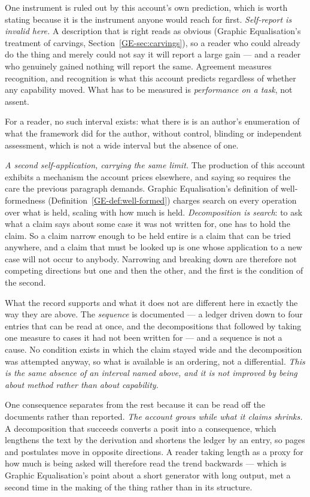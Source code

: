 \documentclass[11pt,a4paper]{article}
\begin{document}
One instrument is ruled out by this account's own prediction, which is worth stating because it is the
instrument anyone would reach for first. \emph{Self-report is invalid here.} A description that is
right reads as obvious (Graphic Equalisation's treatment of carvings, Section~\ref{GE-sec:carvings}), so a reader who could already do the thing and
merely could not say it will report a large gain --- and a reader who genuinely gained nothing will
report the same. Agreement measures recognition, and recognition is what this account predicts
regardless of whether any capability moved. What has to be measured is \emph{performance on a task},
not assent.

For a reader, no such interval exists: what there is is an author's enumeration of what the framework
did for the author, without control, blinding or independent assessment, which
is not a wide interval but the absence of one.

\emph{A second self-application, carrying the same limit.} The production of this account exhibits a
mechanism the account prices elsewhere, and saying so requires the care the previous paragraph
demands. Graphic Equalisation's definition of well-formedness (Definition~\ref{GE-def:well-formed})
charges search on every operation over
what is held, scaling with how much is held. \emph{Decomposition is search}: to ask what a claim says
about some case it was not written for, one has to hold the claim. So a claim narrow enough to be held
entire is a claim that can be tried anywhere, and a claim that must be looked up is one whose
application to a new case will not occur to anybody. Narrowing and breaking down are therefore not
competing directions but one and then the other, and the first is the condition of the second.

What the record supports and what it does not are different here in exactly the way they are above.
The \emph{sequence} is documented --- a ledger driven down to four entries that can be read at once,
and the decompositions that followed by taking one measure to cases it had not been written for --- and
a sequence is not a cause. No condition exists in which the claim stayed wide and the decomposition was
attempted anyway, so what is available is an ordering, not a differential. \emph{This is the same
absence of an interval named above, and it is not improved by being about method rather than about
capability.}

One consequence separates from the rest because it can be read off the documents rather than reported.
\emph{The account grows while what it claims shrinks.} A decomposition that succeeds converts a posit
into a consequence, which lengthens the text by the derivation and shortens the ledger by an entry, so
pages and postulates move in opposite directions. A reader taking length as a proxy for how much is
being asked will therefore read the trend backwards --- which is Graphic Equalisation's point about a short
generator with long output, met a second time in the making of the thing rather than in its structure.
\end{document}
